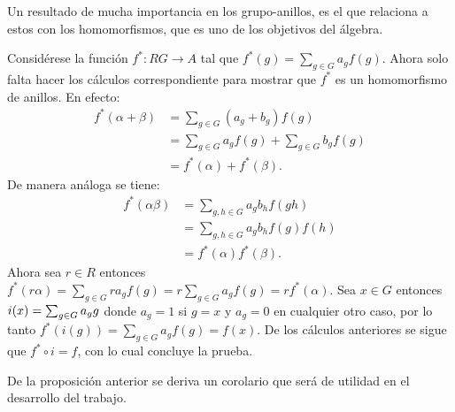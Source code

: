 Un resultado de mucha importancia en los grupo-anillos, es el que relaciona a estos con los homomorfismos, que es uno de los objetivos del álgebra.
\begin{proof*}
Considérese la función $f^* \colon RG \to A$ tal que $f^*(g)=\sum_{g\in G}a_gf(g)$. Ahora solo falta hacer los cálculos correspondiente para mostrar que $f^*$ es un homomorfismo de anillos. En efecto:
\begin{align*}
f^*(\alpha + \beta ) &= \sum_{g \in G}(a_g + b_g)f(g)\\ 
&= \sum_{g \in G}a_gf(g) + \sum_{g \in G}b_gf(g)\\ &= f^*(\alpha) + f^*(\beta).
\end{align*}
De manera análoga se tiene:
\begin{align*}
f^*(\alpha\beta)&=\sum_{g,h\in G}a_gb_hf(gh)\\
&= \sum_{g,h\in G}a_gb_hf(g)f(h)\\ 
&= f^*(\alpha)f^*(\beta).
\end{align*}  
\indent Ahora sea $r \in R$ entonces $f^*(r\alpha)=\sum_{g\in G}ra_gf(g)=r\sum_{g\in G}a_gf(g)=rf^*(\alpha)$.
Sea $x \in G$ entonces $i(x) = \sum_{g \in G} a_{g} g$ donde $a_g = 1$ si $g = x$ y $a_g= 0$ en cualquier otro caso, por lo tanto $f^*(i(g))= \sum_{g \in G} a_gf(g)=f(x)$. De los cálculos anteriores se sigue que $f^*\circ i = f$, con lo cual concluye la prueba. 
\qedhere
\end{proof*}
De la proposición anterior se deriva un corolario que será de utilidad en el desarrollo del trabajo.
